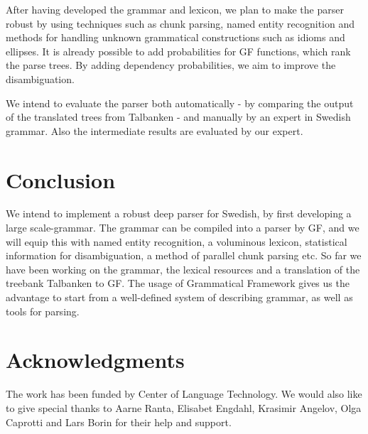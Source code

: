 \documentclass[submission]{eptcs} %
\begin{document}
After having developed the grammar and lexicon, we plan to 
make the parser robust by using techniques such as chunk parsing, named
entity recognition and methods for handling unknown 
grammatical constructions such as idioms and ellipses. %
It is already possible to add probabilities for GF functions,
which rank the parse trees.
By adding dependency probabilities, we aim to improve the
disambiguation.

We intend to evaluate the parser both automatically - by comparing the output of
the translated trees from Talbanken - and manually by an expert in Swedish grammar.
Also the intermediate results are evaluated by our expert.


\section{Conclusion}
We intend to implement a robust deep parser for Swedish, by first developing
a large scale-grammar. The grammar can be compiled into a
parser by GF, and we will equip this with named entity recognition, a
voluminous lexicon, statistical information for disambiguation,
a method of parallel chunk parsing etc.
So far we have been working on the grammar, the lexical resources and
a translation of the treebank Talbanken to GF.
The usage of Grammatical Framework gives us the advantage to start from
a well-defined system of describing grammar, as well as tools for
parsing.


\section{Acknowledgments}
The work has been funded by Center of Language Technology.
We would also like to give special thanks to Aarne Ranta, %
Elisabet Engdahl, Krasimir Angelov, Olga Caprotti and Lars Borin for their help
and support.



\nocite{*}


\end{document}
